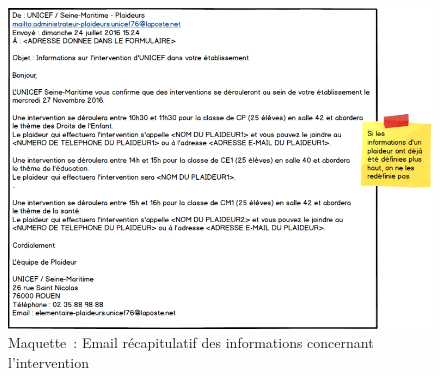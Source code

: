 \begin{figure}[H]
	\centering
	\includegraphics[scale=0.7]{images/maquettes/fonctionnalite6MailDInformationPourLEtablissement.png}
	\caption{Maquette~: Email récapitulatif des informations concernant l'intervention}
	\label{courrielRecapitulatifIntervention}
\end{figure}
